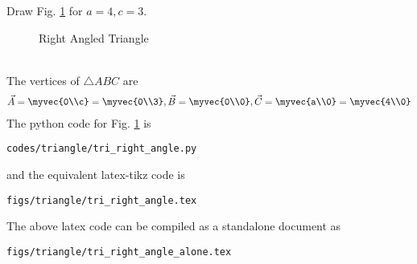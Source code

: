 
%
\item Draw Fig. \ref{fig:tri_right_angle} for $a = 4, c =3$.
\label{const:tri_right_angle}
%
\begin{figure}[!ht]
\centering
\resizebox{\columnwidth}{!}{}
\caption{Right Angled Triangle}
\label{fig:tri_right_angle}	
\end{figure}
\\
\solution The vertices of $\triangle ABC$ are 
\begin{align}
\vec{A} = \myvec{0\\c} = \myvec{0\\3}, \vec{B} = \myvec{0\\0}, \vec{C} = \myvec{a\\0}=\myvec{4\\0}
\end{align}
%
The python code for  Fig. \ref{fig:tri_right_angle} is
\begin{lstlisting}
codes/triangle/tri_right_angle.py
\end{lstlisting}
%
and the equivalent latex-tikz code is
%
\begin{lstlisting}
figs/triangle/tri_right_angle.tex
\end{lstlisting}
%
The above latex code can be compiled as a standalone document as
%
\begin{lstlisting}
figs/triangle/tri_right_angle_alone.tex
\end{lstlisting}
%

